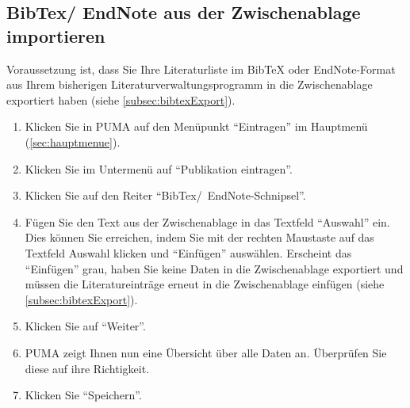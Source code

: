 \subsection{BibTex/ EndNote aus der Zwischenablage importieren}
\label{subsec:bibtexImportieren}
Voraussetzung ist, dass Sie Ihre Literaturliste im BibTeX oder EndNote-Format aus Ihrem bisherigen Literaturverwaltungsprogramm in die Zwischenablage exportiert haben (siehe \autoref{subsec:bibtexExport}).
\begin{enumerate}
    \item Klicken Sie in PUMA auf den Menüpunkt \enquote{Eintragen} im Hauptmenü (\autoref{sec:hauptmenue}). 
    \item Klicken Sie im Untermenü auf \enquote{Publikation eintragen}.
    \item Klicken Sie auf den Reiter \enquote{BibTex/~EndNote-Schnipsel}.
    \item Fügen Sie den Text aus der Zwischenablage in das Textfeld \enquote{Auswahl} ein. Dies können Sie erreichen, indem Sie mit der rechten Maustaste auf das Textfeld Auswahl klicken und \enquote{Einfügen} auswählen. Erscheint das \enquote{Einfügen} grau, haben Sie keine Daten in die Zwischenablage exportiert und müssen die Literatureinträge erneut in die Zwischenablage einfügen (siehe \autoref{subsec:bibtexExport}).
    \item Klicken Sie auf \enquote{Weiter}.
    \item PUMA zeigt Ihnen nun eine Übersicht über alle Daten an. Überprüfen Sie diese auf ihre Richtigkeit.
    \item Klicken Sie \enquote{Speichern}.
\end{enumerate}
